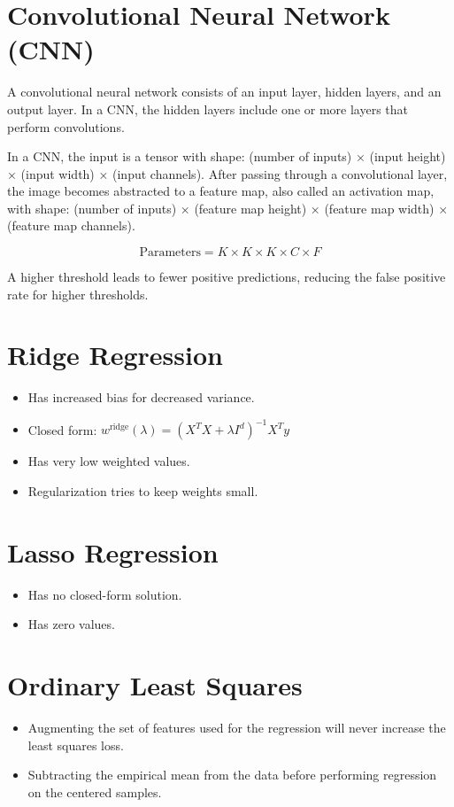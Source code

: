 \documentclass{article}
\begin{document}
\section{Convolutional Neural Network (CNN)}
A convolutional neural network consists of an input layer, hidden layers, and an output layer. In a CNN, the hidden layers include one or more layers that perform convolutions.

In a CNN, the input is a tensor with shape: (number of inputs) × (input height) × (input width) × (input channels). After passing through a convolutional layer, the image becomes abstracted to a feature map, also called an activation map, with shape: (number of inputs) × (feature map height) × (feature map width) × (feature map channels).

\[
\text{Parameters} = K \times K \times K \times C \times F
\]

A higher threshold leads to fewer positive predictions, reducing the false positive rate for higher thresholds.

\section{Ridge Regression}
\begin{itemize}
    \item Has increased bias for decreased variance.
    \item Closed form: $w^{\text{ridge}}(\lambda) = (X^TX + \lambda I^d)^{-1}X^Ty$
    \item Has very low weighted values.
    \item Regularization tries to keep weights small.
\end{itemize}

\section{Lasso Regression}
\begin{itemize}
    \item Has no closed-form solution.
    \item Has zero values.
\end{itemize}

\section{Ordinary Least Squares}
\begin{itemize}
    \item Augmenting the set of features used for the regression will never increase the least squares loss.
    \item Subtracting the empirical mean from the data before performing regression on the centered samples.
\end{itemize}
\end{document}
